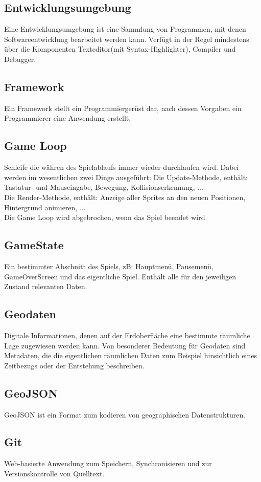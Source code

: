 \documentclass[11pt,a4paper]{article}
\begin{document}
\subsection{Entwicklungsumgebung}
Eine Entwicklungsumgebung ist eine Sammlung von Programmen, mit denen Softwareentwicklung bearbeitet werden kann. Verfügt in der Regel mindestens über die Komponenten Texteditor(mit Syntax-Highlighter), Compiler und Debugger.
\subsection{Framework}
Ein Framework stellt ein Programmiergerüst dar, nach dessen Vorgaben ein Programmierer eine Anwendung erstellt.
\subsection{Game Loop}
Schleife die währen des Spielablaufs immer wieder durchlaufen wird.
Dabei werden im wesentlichen zwei Dinge ausgeführt:
Die Update-Methode, enthält: Tastatur- und Mauseingabe, Bewegung, Kollisionserkennung, ... \\
Die Render-Methode, enthält: Anzeige aller Sprites an den neuen Positionen, Hintergrund animieren, ... \\
Die Game Loop wird abgebrochen, wenn das Spiel beendet wird.
\subsection{GameState}
Ein bestimmter Abschnitt des Spiels, zB: Hauptmenü, Pausemenü, GameOverScreen und das eigentliche Spiel.
Enthält alle für den jeweiligen Zustand relevanten Daten.
\subsection{Geodaten}  
Digitale Informationen, denen auf der Erdoberfläche eine bestimmte räumliche Lage zugewiesen werden kann. Von besonderer Bedeutung für Geodaten sind Metadaten, die die eigentlichen räumlichen Daten zum Beispiel hinsichtlich eines Zeitbezugs oder der Entstehung beschreiben.
\subsection{GeoJSON}
GeoJSON ist ein Format zum kodieren von geographischen Datenstrukturen.
\subsection{Git}
Web-basierte Anwendung zum Speichern, Synchronisieren und zur Versionskontrolle von Quelltext.
\end{document}
